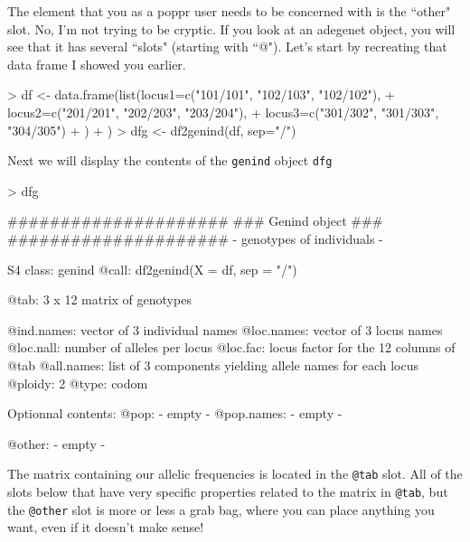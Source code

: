 \documentclass[letterpaper]{article}
\newcommand{\tab}{\hspace*{1em}}
\begin{document}
\tab\tab The element that you as a poppr user needs to be concerned with is the ``other" slot. No, I'm not trying to be cryptic. If you look at an adegenet object, you will see that it has several ``slots" (starting with ``@"). \cite{Jombart:2008} Let's start by recreating that data frame I showed you earlier.
\begin{Schunk}
\begin{Sinput}
> df <- data.frame(list(locus1=c("101/101", "102/103", "102/102"), 
+                       locus2=c("201/201", "202/203", "203/204"), 
+                       locus3=c("301/302", "301/303", "304/305")
+                       )
+                  )
> dfg <- df2genind(df, sep="/")
\end{Sinput}
\end{Schunk}
Next we will display the contents of the \texttt{genind} object \texttt{dfg}
\begin{Schunk}
\begin{Sinput}
> dfg
\end{Sinput}
\begin{Soutput}
   #####################
   ### Genind object ### 
   #####################
- genotypes of individuals - 

S4 class:  genind
@call: df2genind(X = df, sep = "/")

@tab:  3 x 12 matrix of genotypes

@ind.names: vector of  3 individual names
@loc.names: vector of  3 locus names
@loc.nall: number of alleles per locus
@loc.fac: locus factor for the  12 columns of @tab
@all.names: list of  3 components yielding allele names for each locus
@ploidy:  2
@type:  codom

Optionnal contents: 
@pop:  - empty -
@pop.names:  - empty -

@other: - empty -
\end{Soutput}
\end{Schunk}

The matrix containing our allelic frequencies is located in the \texttt{@tab} slot. All of the  slots below that have very specific properties related to the matrix in \texttt{@tab}, but the \texttt{@other} slot is more or less a grab bag, where you can place anything you want, even if it doesn't make sense!
\end{document}
